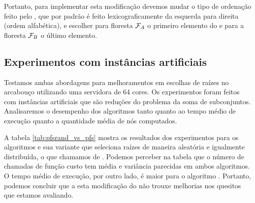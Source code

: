 Portanto, para implementar esta modificação devemos mudar o tipo de
ordenação feito pelo , que por padrão é feito 
lexicograficamente da esquerda para direita (ordem alfabética), e 
escolher para floresta $\mathcal{F}_A$ o primeiro elemento do 
e para a floresta $\mathcal{F}_B$ o último elemento.


\subsection{Experimentos com instâncias artificiais}
\label{pfs:root_choosing:experiments}
Testamos ambas abordagens para melhoramentos em escolhas de raízes no
arcabouço  utilizando uma servidora de 64 cores. Os
experimentos foram feitos com instâncias artificiais que são reduções 
do problema da soma de subconjuntos. Analisaremos o desempenho dos 
algoritmos tanto quanto ao tempo médio de execução quanto a quantidade
média de nós computados.

A tabela \ref{tab:pfsrand_vs_pfs} mostra os resultados dos 
experimentos para os algoritmos  e sua variante que 
seleciona raízes de maneira aleatória e igualmente distribuída, o que 
chamamos de . Podemos perceber na tabela que o número
de chamadas de função custo tem média e variância parecidas em ambos 
algoritmos. O tempo médio de execução, por outro lado, é maior para o
algoritmo . Portanto, podemos concluir que a
esta modificação do  não trouxe melhorias nos quesitos
que estamos avaliando.

